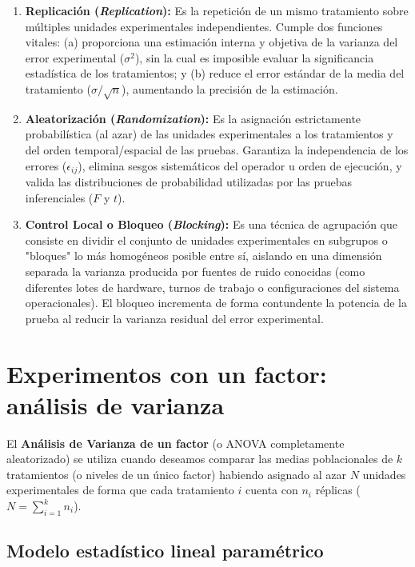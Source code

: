 \begin{teorema}
	\begin{enumerate}
		\item \textbf{Replicación (\emph{Replication}):} Es la repetición de un mismo tratamiento sobre múltiples unidades experimentales independientes. Cumple dos funciones vitales: (a) proporciona una estimación interna y objetiva de la varianza del error experimental ($\sigma^2$), sin la cual es imposible evaluar la significancia estadística de los tratamientos; y (b) reduce el error estándar de la media del tratamiento ($\sigma / \sqrt{n}$), aumentando la precisión de la estimación.
		\item \textbf{Aleatorización (\emph{Randomization}):} Es la asignación estrictamente probabilística (al azar) de las unidades experimentales a los tratamientos y del orden temporal/espacial de las pruebas. Garantiza la independencia de los errores ($\epsilon_{ij}$), elimina sesgos sistemáticos del operador u orden de ejecución, y valida las distribuciones de probabilidad utilizadas por las pruebas inferenciales ($F$ y $t$).
		\item \textbf{Control Local o Bloqueo (\emph{Blocking}):} Es una técnica de agrupación que consiste en dividir el conjunto de unidades experimentales en subgrupos o "bloques" lo más homogéneos posible entre sí, aislando en una dimensión separada la varianza producida por fuentes de ruido conocidas (como diferentes lotes de hardware, turnos de trabajo o configuraciones del sistema operacionales). El bloqueo incrementa de forma contundente la potencia de la prueba al reducir la varianza residual del error experimental.
	\end{enumerate}
\end{teorema}

\section{Experimentos con un factor: análisis de varianza}

El \textbf{Análisis de Varianza de un factor} (o ANOVA completamente aleatorizado) se utiliza cuando deseamos comparar las medias poblacionales de $k$ tratamientos (o niveles de un único factor) habiendo asignado al azar $N$ unidades experimentales de forma que cada tratamiento $i$ cuenta con $n_i$ réplicas ($N = \sum_{i=1}^k n_i$).

\subsection{Modelo estadístico lineal paramétrico}

